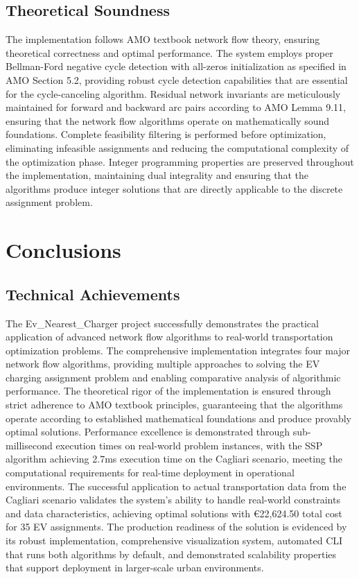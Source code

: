 \documentclass[12pt,a4paper]{article}
\begin{document}
\subsection{Theoretical Soundness}

The implementation follows AMO textbook network flow theory, ensuring theoretical correctness and optimal performance. The system employs proper Bellman-Ford negative cycle detection with all-zeros initialization as specified in AMO Section 5.2, providing robust cycle detection capabilities that are essential for the cycle-canceling algorithm. Residual network invariants are meticulously maintained for forward and backward arc pairs according to AMO Lemma 9.11, ensuring that the network flow algorithms operate on mathematically sound foundations. Complete feasibility filtering is performed before optimization, eliminating infeasible assignments and reducing the computational complexity of the optimization phase. Integer programming properties are preserved throughout the implementation, maintaining dual integrality and ensuring that the algorithms produce integer solutions that are directly applicable to the discrete assignment problem.

\section{Conclusions}

\subsection{Technical Achievements}

The Ev\_Nearest\_Charger project successfully demonstrates the practical application of advanced network flow algorithms to real-world transportation optimization problems. The comprehensive implementation integrates four major network flow algorithms, providing multiple approaches to solving the EV charging assignment problem and enabling comparative analysis of algorithmic performance. The theoretical rigor of the implementation is ensured through strict adherence to AMO textbook principles, guaranteeing that the algorithms operate according to established mathematical foundations and produce provably optimal solutions. Performance excellence is demonstrated through sub-millisecond execution times on real-world problem instances, with the SSP algorithm achieving 2.7ms execution time on the Cagliari scenario, meeting the computational requirements for real-time deployment in operational environments. The successful application to actual transportation data from the Cagliari scenario validates the system's ability to handle real-world constraints and data characteristics, achieving optimal solutions with €22,624.50 total cost for 35 EV assignments. The production readiness of the solution is evidenced by its robust implementation, comprehensive visualization system, automated CLI that runs both algorithms by default, and demonstrated scalability properties that support deployment in larger-scale urban environments.
\end{document}
